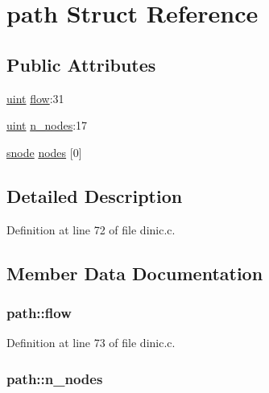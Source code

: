 \hypertarget{structpath}{
\section{path Struct Reference}
\label{structpath}
}
\subsection*{Public Attributes}
\begin{DoxyCompactItemize}
\item 
\hyperlink{dinic_8c_a91ad9478d81a7aaf2593e8d9c3d06a14}{uint} \hyperlink{structpath_a32342c87dc628d2658815b240f71cc6e}{flow}:31
\item 
\hyperlink{dinic_8c_a91ad9478d81a7aaf2593e8d9c3d06a14}{uint} \hyperlink{structpath_a75ea233649b716bcf57cadbe5933f97e}{n\_\-nodes}:17
\item 
\hyperlink{structsnode}{snode} \hyperlink{structpath_ad7d7873e59ef82e10f73e8dbd8a6e5f8}{nodes} \mbox{[}0\mbox{]}
\end{DoxyCompactItemize}


\subsection{Detailed Description}


Definition at line 72 of file dinic.c.



\subsection{Member Data Documentation}
\hypertarget{structpath_a32342c87dc628d2658815b240f71cc6e}{
\subsubsection[{flow}]{ {\bf path::flow}}}
\label{structpath_a32342c87dc628d2658815b240f71cc6e}


Definition at line 73 of file dinic.c.

\hypertarget{structpath_a75ea233649b716bcf57cadbe5933f97e}{
\subsubsection[{n\_\-nodes}]{ {\bf path::n\_\-nodes}}}
\label{structpath_a75ea233649b716bcf57cadbe5933f97e}


